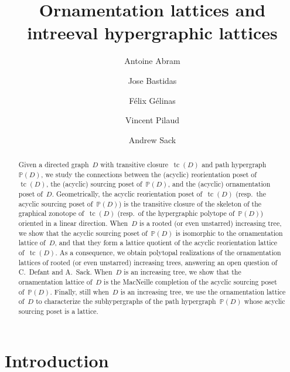 \documentclass{amsart}
\title[Ornamentation lattices and intreeval hypergraphic lattices]{Ornamentation lattices and \\ intreeval hypergraphic lattices}
\author{Antoine Abram}
\author{Jose Bastidas}
\author{F\'elix G\'elinas}
\author{Vincent Pilaud}
\author{Andrew Sack}
\theoremstyle{definition}
\DeclareMathOperator{\tc}{tc} %
\newcommand{\PP}{\mathbb P} %
\begin{document}
\begin{abstract}
Given a directed graph~$D$ with transitive closure~$\tc(D)$ and path hypergraph~$\PP(D)$, we study the connections between the (acyclic) reorientation poset of~$\tc(D)$, the (acyclic) sourcing poset of~$\PP(D)$, and the (acyclic) ornamentation poset of~$D$.
Geometrically, the acyclic reorientation poset of~$\tc(D)$ (resp.~the acyclic sourcing poset of~$\PP(D)$) is the transitive closure of the skeleton of the graphical zonotope of~$\tc(D)$ (resp.~of the hypergraphic polytope of~$\PP(D)$) oriented in a linear direction.
When~$D$ is a rooted (or even unstarred) increasing tree, we show that the acyclic sourcing poset of~$\PP(D)$ is isomorphic to the ornamentation lattice of~$D$, and that they form a lattice quotient of the acyclic reorientation lattice of~$\tc(D)$.
As a consequence, we obtain polytopal realizations of the ornamentation lattices of rooted (or even unstarred) increasing trees, answering an open question of C.~Defant and A.~Sack.
When~$D$ is an increasing tree, we show that the ornamentation lattice of~$D$ is the MacNeille completion of the acyclic sourcing poset of~$\PP(D)$.
Finally, still when~$D$ is an increasing tree, we use the ornamentation lattice of~$D$ to characterize the subhypergraphs of the path hypergraph~$\PP(D)$ whose acyclic sourcing poset is a lattice.
\end{abstract}

\vspace*{-1cm}
\maketitle

\tableofcontents
\vspace*{-1cm}


\pagebreak

\section{Introduction}
\label{sec:introduction}


\end{document}
